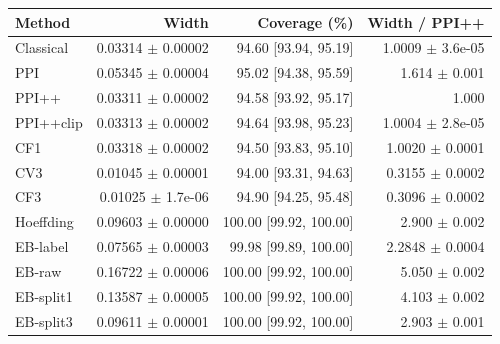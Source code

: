 \small
\begin{tabular}{lrrr}
\toprule
Method & Width & Coverage (\%) & Width / PPI++ \\
\midrule
Classical & 0.03314 $\pm$ 0.00002 & 94.60 [93.94, 95.19] & 1.0009 $\pm$ 3.6e-05 \\
PPI & 0.05345 $\pm$ 0.00004 & 95.02 [94.38, 95.59] & 1.614 $\pm$ 0.001 \\
PPI++ & 0.03311 $\pm$ 0.00002 & 94.58 [93.92, 95.17] & 1.000 \\
PPI++clip & 0.03313 $\pm$ 0.00002 & 94.64 [93.98, 95.23] & 1.0004 $\pm$ 2.8e-05 \\
CF1 & 0.03318 $\pm$ 0.00002 & 94.50 [93.83, 95.10] & 1.0020 $\pm$ 0.0001 \\
CV3 & 0.01045 $\pm$ 0.00001 & 94.00 [93.31, 94.63] & 0.3155 $\pm$ 0.0002 \\
CF3 & 0.01025 $\pm$ 1.7e-06 & 94.90 [94.25, 95.48] & 0.3096 $\pm$ 0.0002 \\
Hoeffding & 0.09603 $\pm$ 0.00000 & 100.00 [99.92, 100.00] & 2.900 $\pm$ 0.002 \\
EB-label & 0.07565 $\pm$ 0.00003 & 99.98 [99.89, 100.00] & 2.2848 $\pm$ 0.0004 \\
EB-raw & 0.16722 $\pm$ 0.00006 & 100.00 [99.92, 100.00] & 5.050 $\pm$ 0.002 \\
EB-split1 & 0.13587 $\pm$ 0.00005 & 100.00 [99.92, 100.00] & 4.103 $\pm$ 0.002 \\
EB-split3 & 0.09611 $\pm$ 0.00001 & 100.00 [99.92, 100.00] & 2.903 $\pm$ 0.001 \\
\bottomrule
\end{tabular}
